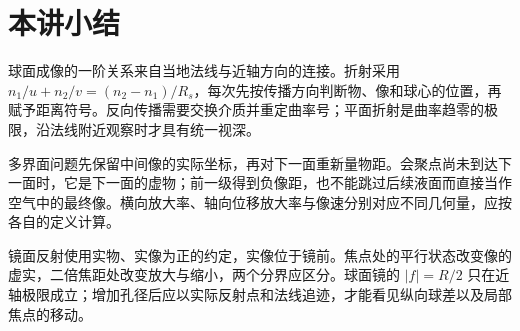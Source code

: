 \section{本讲小结}

球面成像的一阶关系来自当地法线与近轴方向的连接。折射采用 $n_1/u+n_2/v=(n_2-n_1)/R_s$，每次先按传播方向判断物、像和球心的位置，再赋予距离符号。反向传播需要交换介质并重定曲率号；平面折射是曲率趋零的极限，沿法线附近观察时才具有统一视深。

多界面问题先保留中间像的实际坐标，再对下一面重新量物距。会聚点尚未到达下一面时，它是下一面的虚物；前一级得到负像距，也不能跳过后续液面而直接当作空气中的最终像。横向放大率、轴向位移放大率与像速分别对应不同几何量，应按各自的定义计算。

镜面反射使用实物、实像为正的约定，实像位于镜前。焦点处的平行状态改变像的虚实，二倍焦距处改变放大与缩小，两个分界应区分。球面镜的 $|f|=R/2$ 只在近轴极限成立；增加孔径后应以实际反射点和法线追迹，才能看见纵向球差以及局部焦点的移动。
